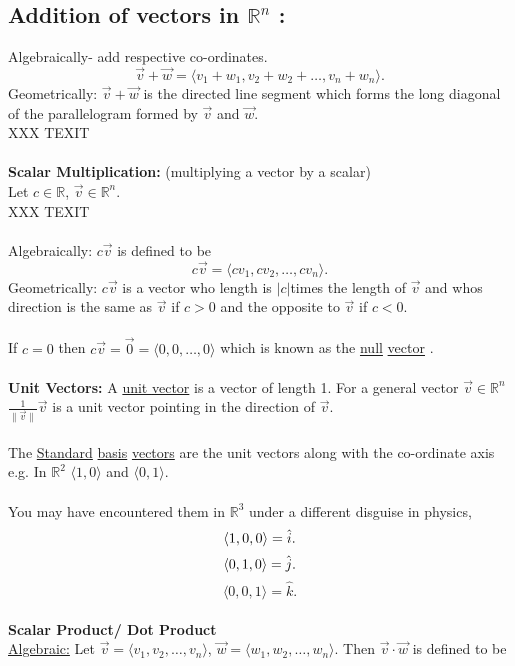 \documentclass{report}
\begin{document}
\subsection{Addition of vectors in $\mathbb{R}^{n}$ :   } Algebraically- add respective co-ordinates.\\
\[
\vec{v} +\vec{w} = \langle v_1+w_1, v_2+w_2 +\ldots, v_n+w_n  \rangle 
.\] 
Geometrically: $\vec{v} +\vec{w}$ is the directed line segment which forms the long diagonal of the parallelogram formed by $\vec{v} $ and $\vec{w} $.
\\
XXX TEXIT
\\
\\
\textbf{Scalar Multiplication: } (multiplying a vector by a scalar)\\
Let $c \in \mathbb{R}$, $\vec{v} \in \mathbb{R}^{n}$.\\
XXX TEXIT\\
\\
Algebraically: $c \vec{v} $ is defined to be 
\[
c \vec{v} = \langle cv_1, cv_2, \ldots, cv_n \rangle 
.\] 
Geometrically: $c\vec{v} $ is a vector who length is $|c|$times the length of  $\vec{v} $ and whos direction is the same as $\vec{v} $ if $c >0$ and the opposite to $\vec{v} $ if $ c<0$.\\
\\
If  $c=0$ then $c \vec{v} =\vec{0} = \langle 0,0,\ldots,0  \rangle $ which is known as the \underline{null}  \underline{vector} .\\
\\
\textbf{Unit Vectors:}  A \underline{unit } \underline{vector}  is a vector of length 1. For a general vector $\vec{v} \in \mathbb{R}^{n} $ $\frac{1}{\|\vec{v} \|}\vec{v} $ is a unit vector pointing in the direction of $\vec{v} $.\\
\\
The \underline{Standard} \underline{basis} \underline{vectors}  are the unit vectors along with the co-ordinate axis e.g. In $\mathbb{R}^2$ $\langle 1,0  \rangle $ and $\langle 0,1  \rangle $.\\
\\
You may have encountered them in $\mathbb{R}^3$ under a different disguise in physics,
\[
\langle 1,0,0  \rangle = \hat{i}\\
.\] 
\[
\langle 0,1,0  \rangle = \hat{j}\\
.\] 
\[
\langle 0,0,1  \rangle = \hat{k}
.\] 
\\
\textbf{Scalar Product/ Dot Product} \\
\underline{Algebraic:}  Let $\vec{v} = \langle v_1,v_2,\ldots,v_n  \rangle $, $\vec{w} = \langle w_1,w_2,\ldots, w_n  \rangle $. Then $\vec{v} \cdot \vec{w} $ is defined to be 
\end{document}
